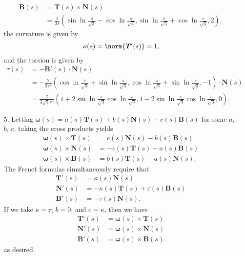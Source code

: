 \documentclass[a4paper,12pt]{article}
\newcommand{\bs}{\boldsymbol}
\theoremstyle{remark}
\begin{document}
\begin{enumerate}
\begin{align*}
            \bs{B}(s) &= \bs{T}(s) \times \bs{N}(s) \\
            &= \frac{1}{3s}(\sin\ln\frac{s}{\sqrt{3}} - \cos\ln\frac{s}{\sqrt{3}}, \sin\ln\frac{s}{\sqrt{3}} + \cos\ln\frac{s}{\sqrt{3}}, 2),
        \end{align*}
        the curvature is given by
        \begin{align*}
            \kappa(s) = \norm{\bs{T}'(s)} = 1,
        \end{align*}
        and the torsion is given by
        \begin{align*}
            \tau(s) &= -\bs{B}'(s) \cdot \bs{N}(s) \\
            &= -\frac{2}{3s^2} ( \cos\ln\frac{s}{\sqrt{3}} + \sin\ln\frac{s}{\sqrt{3}}, \cos\ln\frac{s}{\sqrt{3}} + \sin\ln\frac{s}{\sqrt{3}}, -1 ) \cdot \bs{N}(s) \\
            &= \frac{2}{3\sqrt{3}s^3} (1 + 2\sin\ln\frac{s}{\sqrt{3}}\cos\ln\frac{s}{\sqrt{3}}, 1 - 2\sin\ln\frac{s}{\sqrt{3}}\cos\ln\frac{s}{\sqrt{3}}, 0).
        \end{align*}

    \item[5.]
        Letting $\bs{\omega}(s) = a(s)\bs{T}(s) + b(s)\bs{N}(s) + c(s)\bs{B}(s)$ for some $a$, $b$, $c$, taking the cross products yields
        \begin{align*}
            \bs{\omega}(s) \times \bs{T}(s) &= c(s)\bs{N}(s) - b(s)\bs{B}(s) \\
            \bs{\omega}(s) \times \bs{N}(s) &= -c(s)\bs{T}(s) + a(s)\bs{B}(s) \\
            \bs{\omega}(s) \times \bs{B}(s) &= b(s)\bs{T}(s) - a(s)\bs{N}(s).
        \end{align*}
        The Frenet formulas simultaneously require that
        \begin{align*}
            \bs{T}'(s) &= \kappa(s)\bs{N}(s) \\
            \bs{N}'(s) &= -\kappa(s)\bs{T}(s) + \tau(s)\bs{B}(s) \\
            \bs{B}'(s) &= -\tau(s)\bs{N}(s).
        \end{align*}
        If we take $a = \tau$, $b = 0$, and $c = \kappa$, then we have
        \begin{align*}
            \bs{T}'(s) &= \bs{\omega}(s) \times \bs{T}(s) \\
            \bs{N}'(s) &= \bs{\omega}(s) \times \bs{N}(s) \\
            \bs{B}'(s) &= \bs{\omega}(s) \times \bs{B}(s)
        \end{align*}
        as desired.


\end{enumerate}
\end{document}
